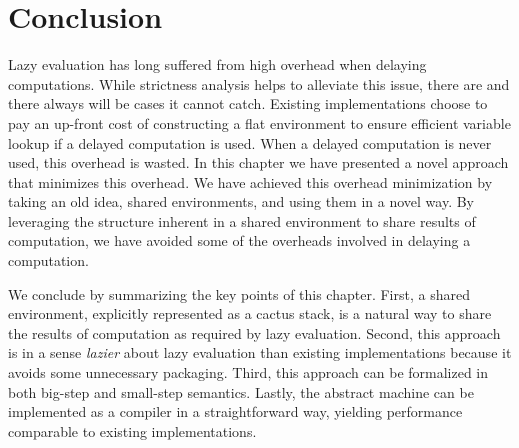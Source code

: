 \section{Conclusion} \label{sec:conc}

Lazy evaluation has long suffered from high overhead when delaying computations.
While strictness analysis helps to alleviate this issue, there are and there
always will be cases it cannot catch. Existing implementations choose to pay an
up-front cost of constructing a flat environment to ensure efficient variable
lookup if a delayed computation is used. When a delayed computation is never
used, this overhead is wasted. In this chapter we have presented a novel approach
that minimizes this overhead. We have achieved this overhead minimization by
taking an old idea, shared environments, and using them in a novel way. By
leveraging the structure inherent in a shared environment to share results of
computation, we have avoided some of the overheads involved in delaying a
computation. 

We conclude by summarizing the key points of this chapter. First, a shared
environment, explicitly represented as a cactus stack, is a natural way to share
the results of computation as required by lazy evaluation. Second, this approach
is in a sense \emph{lazier} about lazy evaluation than existing implementations
because it avoids some unnecessary packaging. Third, this approach can be
formalized in both big-step and small-step semantics. Lastly, the abstract
machine can be implemented as a compiler in a straightforward way, yielding
performance comparable to existing implementations. 
